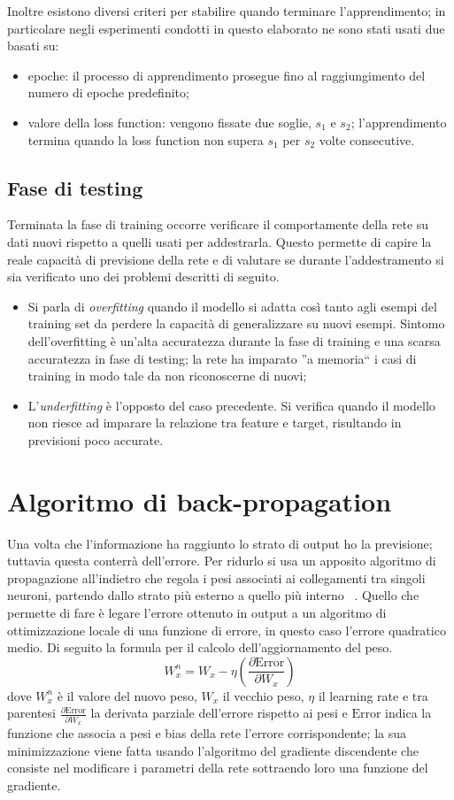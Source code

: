 \documentclass[12pt]{report}
\begin{document}
Inoltre esistono diversi criteri per stabilire quando terminare l'apprendimento; in particolare negli esperimenti condotti in questo elaborato ne sono stati usati due basati su:
\begin{itemize}
\item{epoche}: il processo di apprendimento prosegue fino al raggiungimento del numero di epoche predefinito;
\item{valore della loss function}: vengono fissate due soglie, $s_1$ e $s_2$; l'apprendimento termina quando la loss function non supera $s_1$ per $s_2$ volte consecutive.
\end{itemize}

\subsection{Fase di testing}
Terminata la fase di training occorre verificare il comportamente della rete su dati nuovi rispetto a quelli usati per addestrarla. Questo permette di capire la reale capacità di previsione della rete e di valutare se durante l'addestramento si sia verificato uno dei problemi descritti di seguito.
\begin{itemize}
\item{Si parla di \textit{overfitting} quando il modello si adatta così tanto agli esempi del training set da perdere la capacità di generalizzare su nuovi esempi. Sintomo dell'overfitting è un'alta accuratezza durante la fase di training e una scarsa accuratezza in fase di testing; la rete ha imparato ''a memoria`` i casi di training in modo tale da non riconoscerne di nuovi};
\item{L'\textit{underfitting} è l'opposto del caso precedente. Si verifica quando il modello non riesce ad imparare la relazione tra feature e target, risultando in previsioni poco accurate}.
\end{itemize}

\section{Algoritmo di back-propagation}\label{backprop}
Una volta che l’informazione ha raggiunto lo strato di output ho la previsione; tuttavia questa conterrà dell’errore. Per ridurlo si usa un apposito algoritmo di propagazione all’indietro che regola i pesi associati ai collegamenti tra singoli neuroni, partendo dallo strato più esterno a quello più interno ~\cite{Backpropagation}. Quello che permette di fare è legare l'errore ottenuto in output a un algoritmo di ottimizzazione locale di una funzione di errore, in questo caso l'errore quadratico medio. Di seguito la formula per il calcolo dell'aggiornamento del peso.
$$W^n_x = W_x - \eta \left(\frac{\partial \mathrm{Error}}{\partial W_x}\right)$$ dove $W^n_x$ è il valore del nuovo peso, $W_x$ il vecchio peso, $\eta$ il learning rate e tra parentesi $\frac{\partial \mathrm{Error}}{\partial W_x}$ la derivata parziale dell'errore rispetto ai pesi e $\mathrm{Error}$ indica la funzione che associa a pesi e bias della rete l'errore corrispondente; la sua minimizzazione viene fatta usando l'algoritmo del gradiente discendente che consiste nel modificare i parametri della rete sottraendo loro una funzione del gradiente.
\end{document}
